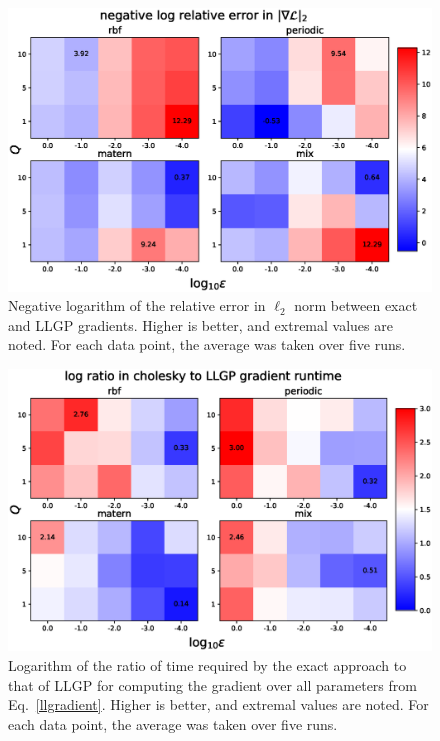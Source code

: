 \documentclass{article}
\begin{document}
\begin{figure}[!ht]
\vskip 0.2in
\begin{center}
\centerline{\includegraphics[width=\columnwidth]{relgrad_l2.eps}}
\caption{Negative logarithm of the relative error in $\ell_2$ norm between exact and LLGP gradients. Higher is better, and extremal values are noted.  For each data point, the average was taken over five runs.}
\label{fig:relgrad}
\end{center}
\vskip -0.2in
\end{figure}

\begin{figure}[!ht]
\vskip 0.2in
\begin{center}
\centerline{\includegraphics[width=\columnwidth]{time_ratio.eps}}
\caption{Logarithm of the ratio of time required by the exact approach to that of LLGP for computing the gradient over all parameters from Eq.~\ref{llgradient}. Higher is better, and extremal values are noted. For each data point, the average was taken over five runs.}
\label{fig:gradtime}
\end{center}
\vskip -0.2in
\end{figure}
\end{document}

